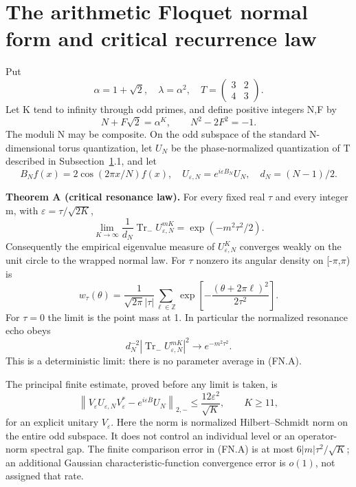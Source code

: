 \section{The arithmetic Floquet normal form and critical recurrence law}\label{sec:floquet}
Put \[
 \alpha=1+\sqrt2,\quad \lambda=\alpha^2,\quad
 T=\begin{pmatrix}3&2\\4&3\end{pmatrix}.
\] Let K tend to infinity through odd primes, and define positive integers N,F by \[
 N+F\sqrt2=\alpha^K,\qquad N^2-2F^2=-1.
\] The moduli N may be composite. On the odd subspace of the standard N-dimensional torus quantization, let \(U_{N}\) be the phase-normalized quantization of T described in Subsection~\ref{sec:floquet}.1, and let \[
 B_N f(x)=2\cos(2\pi x/N)f(x),\quad
 U_{\varepsilon,N}=e^{i\varepsilon B_N}U_N,\quad
 d_N=(N-1)/2.
\]

\textbf{Theorem A (critical resonance law).} For every fixed real \(\tau\) and every integer m, with \(\varepsilon=\tau/\sqrt{2K}\), \[
 \lim_{K\longrightarrow\infty}
 \frac{1}{d_N}\operatorname{Tr}_{-}
       U_{\varepsilon,N}^{mK}
       =\exp(-m^2\tau^2/2).                                      \tag{FN.A}
\] Consequently the empirical eigenvalue measure of \(U_{\varepsilon,N}^K\) converges weakly on the unit circle to the wrapped normal law. For \(\tau\) nonzero its angular density on {[}-\(\pi\),\(\pi\)) is \[
 w_\tau(\theta)=\frac{1}{\sqrt{2\pi}|\tau|}
       \sum_{\ell\in\mathbb Z}
       \exp\!\left[-\frac{(\theta+2\pi\ell)^2}{2\tau^2}\right].   \tag{FN.B}
\] For \(\tau=0\) the limit is the point mass at 1. In particular the normalized resonance echo obeys \[
 d_N^{-2}\left|\operatorname{Tr}_{-}U_{\varepsilon,N}^{mK}\right|^2
       \longrightarrow e^{-m^2\tau^2}.                          \tag{FN.C}
\] This is a deterministic limit: there is no parameter average in (FN.A).

The principal finite estimate, proved before any limit is taken, is \[
 \left\|V_\varepsilon U_{\varepsilon,N}V_\varepsilon^*
            -e^{i\varepsilon\overline B}U_N\right\|_{2,-}
       \leq \frac{12\varepsilon^2}{\sqrt K},\qquad K\geq11,        \tag{FN.D}
\] for an explicit unitary \(V_{\varepsilon}\). Here the norm is normalized Hilbert--Schmidt norm on the entire odd subspace. It does not control an individual level or an operator-norm spectral gap. The finite comparison error in (FN.A) is at most \(6|m|\tau^2/\sqrt K\); an additional Gaussian characteristic-function convergence error is \(o(1)\), not assigned that rate.

